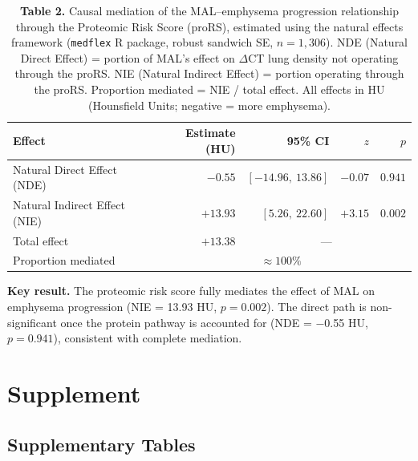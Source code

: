 \documentclass[11pt, letterpaper]{article}
\begin{document}
\begin{table}[H]
\centering
\caption*{\textbf{Table 2.} Causal mediation of the MAL--emphysema
  progression relationship through the Proteomic Risk Score (proRS),
  estimated using the natural effects framework (\texttt{medflex} R
  package, robust sandwich SE, $n = 1{,}306$). NDE (Natural Direct
  Effect) = portion of MAL's effect on $\Delta$CT lung density not
  operating through the proRS. NIE (Natural Indirect Effect) = portion
  operating through the proRS. Proportion mediated = NIE / total effect.
  All effects in HU (Hounsfield Units; negative = more emphysema).}
\begin{tabular}{lrrrr}
\toprule
Effect & Estimate (HU) & 95\% CI & $z$ & $p$ \\
\midrule
Natural Direct Effect (NDE)   & $-0.55$  & $[-14.96,\ 13.86]$ & $-0.07$ & $0.941$ \\
Natural Indirect Effect (NIE) & $+13.93$ & $[5.26,\ 22.60]$   & $+3.15$ & $0.002$ \\
Total effect                  & $+13.38$ & \multicolumn{3}{c}{---} \\
Proportion mediated           & \multicolumn{4}{c}{${\approx}100\%$} \\
\bottomrule
\end{tabular}
\end{table}

\textbf{Key result.} The proteomic risk score fully mediates the
effect of MAL on emphysema progression (NIE = 13.93 HU,
$p = 0.002$). The direct path is non-significant once the protein
pathway is accounted for (NDE = $-$0.55 HU, $p = 0.941$), consistent
with complete mediation.

\section*{Supplement}

\subsection*{Supplementary Tables}
\end{document}
